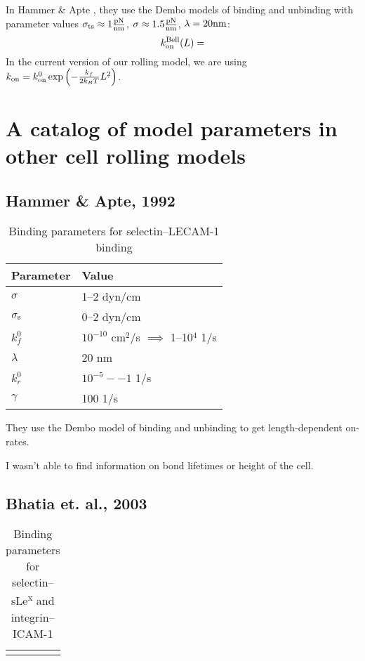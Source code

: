 \documentclass{article}
\newcommand{\tn}{\textnormal}
\begin{document}
In Hammer \& Apte \cite{Hammer1992}, they use the Dembo models of
binding and unbinding with parameter values $\sigma_\tn{ts} \approx
1 \frac{\tn{pN}}{\tn{nm}}$, $\sigma \approx 1.5
\frac{\tn{pN}}{\tn{nm}}$, $\lambda = 20 \tn{nm}$:
\begin{equation}
  \label{eq:bell-on}
  k_\tn{on}^\tn{Bell}(L) = 
\end{equation}
In the current
version of our rolling model, we are using $k_\tn{on} = \onConst \exp
\left(-\frac{\stiffness}{2\boltzmann\temp} \length^2\right)$. 

\section{A catalog of model parameters in other cell rolling models}
\label{sec:catal-model-param}

\subsection{Hammer \& Apte, 1992 \cite{Hammer1992}}
\label{sec:hammer-apte}

\begin{table}[h]
  \centering
  \begin{tabular}{ll} \hline
    Parameter & Value \\ \hline
    $\sigma$ & 1--2 dyn/cm \\
    $\sigma_\tn{s}$ & 0--2 dyn/cm \\
    $k_f^0$ & $10^{-10}$ cm$^2$/s $\implies$ 1--10$^4$ 1/s \\
    $\lambda$ & 20 nm \\
    $k_r^0$ & $10^{-5}--1$ 1/s \\
    $\gamma$ & 100 1/s \\ \hline
  \end{tabular}
  \caption{Binding parameters for selectin--LECAM-1 binding}
  \label{tab:hammer-apte-pars}
\end{table}

They use the Dembo model of binding and unbinding to get
length-dependent on-rates.

I wasn't able to find information on bond lifetimes or height of the
cell.

\subsection{Bhatia et. al., 2003 \cite{Bhatia2003}}
\label{sec:bhatia}

\begin{table}[h]
  \centering
  \begin{tabular}{lll}
    &&
  \end{tabular}
  \caption{Binding parameters for selectin--sLe\textsuperscript{x} and
    integrin--ICAM-1}
  \label{tab:bhatia-pars}
\end{table}
\end{document}
